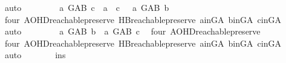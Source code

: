 \begin{isabellebody}
\ auto\isanewline
\ \ \ \ \isamarkupfalse%
\ \isamarkupfalse%
\ {\isachardoublequoteopen}{\isasymnot}\ {\isacharparenleft}{\kern0pt}{\isacharparenleft}{\kern0pt}a\ {\isasymrightarrow}\isactrlsup {\isacharplus}{\kern0pt}\isactrlbsub G{\isacharunderscore}{\kern0pt}AB\isactrlesub \ c\ {\isasymor}\ a\ {\isacharequal}{\kern0pt}\ c{\isacharparenright}{\kern0pt}\ {\isasymand}\ {\isacharparenleft}{\kern0pt}{\isasymnot}\ a\ {\isasymrightarrow}\isactrlsup {\isacharplus}{\kern0pt}\isactrlbsub G{\isacharunderscore}{\kern0pt}AB\isactrlesub \ b{\isacharparenright}{\kern0pt}{\isacharparenright}{\kern0pt}{\isachardoublequoteclose}\ \isanewline
\ \ \ \ \ \ \isamarkupfalse%
\ four\ AOHD{\isachardot}{\kern0pt}reachable{}{\isacharunderscore}{\kern0pt}preserve\ HB{}{\isachardot}{\kern0pt}reachable{}{\isacharunderscore}{\kern0pt}preserve\ a{\isacharunderscore}{\kern0pt}in{\isacharunderscore}{\kern0pt}G{\isacharunderscore}{\kern0pt}A\ b{\isacharunderscore}{\kern0pt}in{\isacharunderscore}{\kern0pt}G{\isacharunderscore}{\kern0pt}A\ c{\isacharunderscore}{\kern0pt}in{\isacharunderscore}{\kern0pt}G{\isacharunderscore}{\kern0pt}A\ \isamarkupfalse%
\ auto\isanewline
\ \ \ \ \isamarkupfalse%
\ \isamarkupfalse%
\ {\isachardoublequoteopen}{\isasymnot}\ {\isacharparenleft}{\kern0pt}a\ {\isasymrightarrow}\isactrlsup {\isacharplus}{\kern0pt}\isactrlbsub G{\isacharunderscore}{\kern0pt}AB\isactrlesub \ b\ {\isasymand}\ a\ {\isasymrightarrow}\isactrlsup {\isacharplus}{\kern0pt}\isactrlbsub G{\isacharunderscore}{\kern0pt}AB\isactrlesub \ c{\isacharparenright}{\kern0pt}{\isachardoublequoteclose}\ \isamarkupfalse%
\ four\ AOHD{\isachardot}{\kern0pt}reachable{}{\isacharunderscore}{\kern0pt}preserve\ \isanewline
\ \ \ \ \ \ \isamarkupfalse%
\ four\ AOHD{\isachardot}{\kern0pt}reachable{}{\isacharunderscore}{\kern0pt}preserve\ HB{}{\isachardot}{\kern0pt}reachable{}{\isacharunderscore}{\kern0pt}preserve\ a{\isacharunderscore}{\kern0pt}in{\isacharunderscore}{\kern0pt}G{\isacharunderscore}{\kern0pt}A\ b{\isacharunderscore}{\kern0pt}in{\isacharunderscore}{\kern0pt}G{\isacharunderscore}{\kern0pt}A\ c{\isacharunderscore}{\kern0pt}in{\isacharunderscore}{\kern0pt}G{\isacharunderscore}{\kern0pt}A\ \isamarkupfalse%
\ auto\isanewline
\ \ \ \ \isamarkupfalse%
\ \isamarkupfalse%
\ ins{}{\isacharcolon}{\kern0pt}\isanewline

\end{isabellebody}
